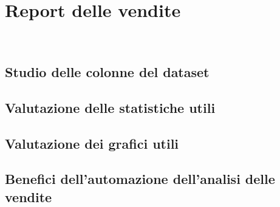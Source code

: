 \chapter{Report delle vendite}
\label{cap:report-vendite}

\\

\section{Studio delle colonne del dataset}

\section{Valutazione delle statistiche utili}

\section{Valutazione dei grafici utili}

\section{Benefici dell’automazione dell’analisi delle vendite}
